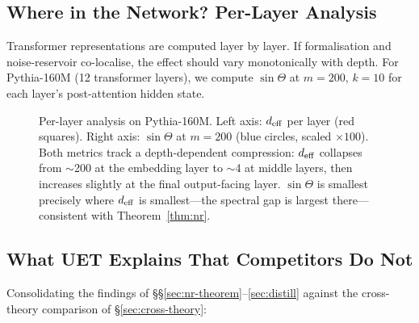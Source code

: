 \subsection{Where in the Network? Per-Layer Analysis}
\label{sec:nr-layer-sec}

Transformer representations are computed layer by layer.
If formalisation and noise-reservoir co-localise, the effect should vary
monotonically with depth.
For Pythia-160M (12 transformer layers), we compute $\sin\Theta$ at
$m = 200$, $k = 10$ for each layer's post-attention hidden state.

\begin{figure}[H]
\centering
{}
\caption{Per-layer analysis on Pythia-160M.
Left axis: $d_{\mathrm{eff}}$ per layer (red squares).
Right axis: $\sin\Theta$ at $m = 200$ (blue circles, scaled $\times 100$).
Both metrics track a depth-dependent compression: $d_{\mathrm{eff}}$ collapses from
$\sim$200 at the embedding layer to $\sim$4 at middle layers, then increases
slightly at the final output-facing layer.
$\sin\Theta$ is smallest precisely where $d_{\mathrm{eff}}$ is smallest---the spectral
gap is largest there---consistent with Theorem~\ref{thm:nr}.}
\label{fig:nr-layer}
\end{figure}

\subsection{What UET Explains That Competitors Do Not}
\label{sec:uet-vs-others}

Consolidating the findings of \S\S\ref{sec:nr-theorem}--\ref{sec:distill}
against the cross-theory comparison of \S\ref{sec:cross-theory}:

